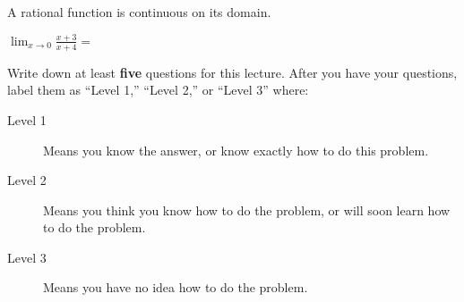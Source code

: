 \documentclass{ximera}
\begin{document}
 \begin{question}
 	\begin{hint}
		A rational function is continuous on its domain.
	\end{hint}
  	 $\lim_{x \to 0}\frac{x+3}{x+4}=$
  \end{question}  
  

Write down at least \textbf{five} questions for this lecture. After
you have your questions, label them as ``Level 1,'' ``Level 2,'' or ``Level 3'' where:
\begin{description}
\item[Level 1] Means you know the answer, or know exactly how to do this problem.
\item[Level 2] Means you think you know how to do the problem, or will soon learn how to do the problem.
\item[Level 3] Means you have no idea how to do the problem. 
\end{description}
\begin{question}
  \begin{freeResponse}
  \end{freeResponse}
\end{question}
\end{document}

